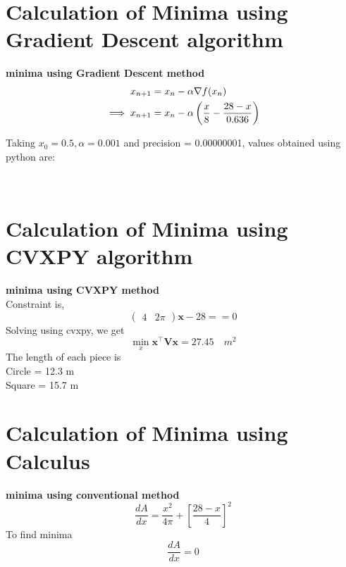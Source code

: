 \documentclass[journal,12pt,twocolumn]{IEEEtran}
\let\vec\mathbf
\providecommand{\brak}[1]{\ensuremath{\left(#1\right)}}
\begin{document}
\section{Calculation of Minima using Gradient Descent algorithm}
\textbf{minima using  Gradient Descent  method}
    \begin{align}
        x_{n+1} &= x_n - \alpha \nabla f(x_n) \\
        \vspace{0.35cm}
        \implies x_{n+1} &= x_n - \alpha\brak{\frac{x}{8}-\frac{28-x}{0.636}}
    \end{align}
\begin{flushleft}
Taking $x_0=0.5,\alpha = 0.001$ and precision = 0.00000001, values obtained using python are:
\end{flushleft} 
\vspace{0.35cm}
\center
        \vspace{0.45cm}
         \\
        \vspace{0.45cm}
\endcenter
\section{Calculation of Minima using CVXPY algorithm}
\textbf{minima using CVXPY method} \\
\noindent Constraint is, 
\begin{equation}
\begin{pmatrix}4& 2\pi\end{pmatrix}  \vec{x} -28 == 0
\end{equation}
Solving using cvxpy, we get
\begin{equation}
\min_{x} \vec{x}^{\top}\vec{V}\vec{x} = 27.45 \quad m^2
\end{equation}
The length of each piece is \\
Circle  = 12.3 m \\
Square = 15.7 m  
\section{Calculation of Minima using Calculus}
 \textbf{minima using conventional method}
    \begin{equation}
        \frac{dA}{dx} = \frac{x^2}{4\pi} + [\frac{28-x}{4}]^2
    \end{equation}
To find minima
    \begin{equation}
	    \frac{dA}{dx} = 0
	    \end{equation}
\end{document}
